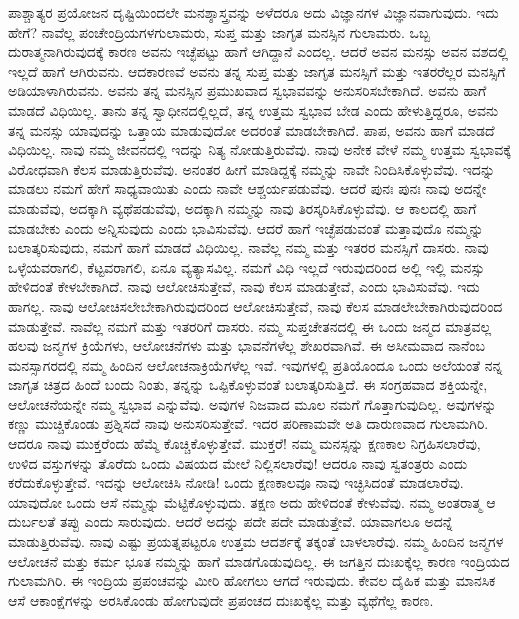 ಪಾಶ್ಚಾತ್ಯರ ಪ್ರಯೋಜನ ದೃಷ್ಟಿಯಿಂದಲೇ ಮನಶ್ಶಾಸ್ತ್ರವನ್ನು ಅಳೆದರೂ ಅದು ವಿಜ್ಞಾನಗಳ ವಿಜ್ಞಾನವಾಗುವುದು. ಇದು ಹೇಗೆ? ನಾವೆಲ್ಲ ಪಂಚೇಂದ್ರಿಯಗಳ\break ಗುಲಾಮರು, ಸುಪ್ತ ಮತ್ತು ಜಾಗೃತ ಮನಸ್ಸಿನ ಗುಲಾಮರು. ಒಬ್ಬ ದುರಾತ್ಮನಾಗಿರುವುದಕ್ಕೆ ಕಾರಣ ಅವನು ಇಚ್ಛೆಪಟ್ಟು ಹಾಗೆ ಆಗಿದ್ದಾನೆ ಎಂದಲ್ಲ. ಆದರೆ ಅವನ ಮನಸ್ಸು ಅವನ ವಶದಲ್ಲಿ ಇಲ್ಲದೆ ಹಾಗೆ ಆಗಿರುವನು. ಆದಕಾರಣವೆ ಅವನು ತನ್ನ ಸುಪ್ತ ಮತ್ತು ಜಾಗೃತ ಮನಸ್ಸಿಗೆ ಮತ್ತು ಇತರರೆಲ್ಲರ ಮನಸ್ಸಿಗೆ ಅಡಿಯಾಳಾಗಿರುವನು. ಅವನು ತನ್ನ ಮನಸ್ಸಿನ ಪ್ರಮುಖವಾದ ಸ್ವಭಾವವನ್ನು ಅನುಸರಿಸಬೇಕಾಗಿದೆ. ಅವನು ಹಾಗೆ ಮಾಡದೆ ವಿಧಿಯಿಲ್ಲ. ತಾನು ತನ್ನ ಸ್ವಾಧೀನದಲ್ಲಿಲ್ಲದೆ, ತನ್ನ ಉತ್ತಮ ಸ್ವಭಾವ ಬೇಡ ಎಂದು ಹೇಳುತ್ತಿದ್ದರೂ, ಅವನು ತನ್ನ ಮನಸ್ಸು ಯಾವುದನ್ನು ಒತ್ತಾಯ ಮಾಡುವುದೋ ಅದರಂತೆ ಮಾಡಬೇಕಾಗಿದೆ. ಪಾಪ, ಅವನು ಹಾಗೆ ಮಾಡದೆ ವಿಧಿಯಿಲ್ಲ. ನಾವು ನಮ್ಮ ಜೀವನದಲ್ಲಿ ಇದನ್ನು ನಿತ್ಯ ನೋಡುತ್ತಿರುವೆವು. ನಾವು ಅನೇಕ ವೇಳೆ ನಮ್ಮ ಉತ್ತಮ ಸ್ವಭಾವಕ್ಕೆ ವಿರೋಧವಾಗಿ ಕೆಲಸ ಮಾಡುತ್ತಿರುವೆವು. ಅನಂತರ ಹೀಗೆ ಮಾಡಿದ್ದಕ್ಕೆ ನಮ್ಮನ್ನು ನಾವೇ ನಿಂದಿಸಿಕೊಳ್ಳುವೆವು. ಇದನ್ನು ಮಾಡಲು ನಮಗೆ ಹೇಗೆ ಸಾಧ್ಯವಾಯಿತು ಎಂದು ನಾವೇ ಆಶ್ಚರ್ಯಪಡುವೆವು. ಆದರೆ ಪುನಃ ಪುನಃ ನಾವು ಅದನ್ನೇ ಮಾಡುವೆವು, ಅದಕ್ಕಾಗಿ ವ್ಯಥೆಪಡುವೆವು, ಅದಕ್ಕಾಗಿ ನಮ್ಮನ್ನು ನಾವು ತಿರಸ್ಕರಿಸಿಕೊಳ್ಳುವೆವು. ಆ ಕಾಲದಲ್ಲಿ ಹಾಗೆ ಮಾಡಬೇಕು ಎಂದು ಅನ್ನಿಸುವುದು ಎಂದು ಭಾವಿಸುವೆವು. ಆದರೆ ಹಾಗೆ ಇಚ್ಛೆಪಡುವಂತೆ ಮತ್ತಾವುದೊ ನಮ್ಮನ್ನು ಬಲಾತ್ಕರಿಸುವುದು, ನಮಗೆ ಹಾಗೆ ಮಾಡದೆ ವಿಧಿಯಿಲ್ಲ. ನಾವೆಲ್ಲ ನಮ್ಮ ಮತ್ತು ಇತರರ ಮನಸ್ಸಿಗೆ ದಾಸರು. ನಾವು ಒಳ್ಳೆಯವರಾಗಲಿ, ಕೆಟ್ಟವರಾಗಲಿ, ಏನೂ ವ್ಯತ್ಯಾಸವಿಲ್ಲ. ನಮಗೆ ವಿಧಿ ಇಲ್ಲದೆ ಇರುವುದರಿಂದ ಅಲ್ಲಿ ಇಲ್ಲಿ ಮನಸ್ಸು ಹೇಳಿದಂತೆ ಕೇಳಬೇಕಾಗಿದೆ. ನಾವು ಆಲೋಚಿಸುತ್ತೇವೆ, ನಾವು ಕೆಲಸ ಮಾಡುತ್ತೇವೆ, ಎಂದು ಭಾವಿಸುವೆವು. ಇದು ಹಾಗಲ್ಲ. ನಾವು ಆಲೋಚಿಸಲೇಬೇಕಾಗಿರುವುದರಿಂದ ಆಲೋಚಿಸುತ್ತೇವೆ, ನಾವು ಕೆಲಸ ಮಾಡಲೇಬೇಕಾಗಿರುವುದರಿಂದ ಮಾಡುತ್ತೇವೆ. ನಾವೆಲ್ಲ ನಮಗೆ ಮತ್ತು ಇತರರಿಗೆ ದಾಸರು. ನಮ್ಮ ಸುಪ್ತಚೇತನದಲ್ಲಿ ಈ ಒಂದು ಜನ್ಮದ ಮಾತ್ರವಲ್ಲ ಹಲವು ಜನ್ಮಗಳ ಕ್ರಿಯೆಗಳು, ಆಲೋಚನೆಗಳು ಮತ್ತು ಭಾವನೆಗಳೆಲ್ಲ ಶೇಖರವಾಗಿವೆ. ಈ ಅಸೀಮವಾದ ನಾನೆಂಬ ಮನಸ್ಸಾಗರದಲ್ಲಿ ನಮ್ಮ ಹಿಂದಿನ ಆಲೋಚನಾಕ್ರಿಯೆಗಳೆಲ್ಲ ಇವೆ. ಇವುಗಳಲ್ಲಿ ಪ್ರತಿಯೊಂದೂ ಒಂದು ಅಲೆಯಂತೆ ನನ್ನ ಜಾಗೃತ ಚಿತ್ರದ ಹಿಂದೆ ಬಂದು ನಿಂತು, ತನ್ನನ್ನು ಒಪ್ಪಿಕೊಳ್ಳುವಂತೆ ಬಲಾತ್ಕರಿಸುತ್ತಿದೆ. ಈ ಸಂಗ್ರಹವಾದ ಶಕ್ತಿಯನ್ನೇ, ಆಲೋಚನೆಯನ್ನೇ ನಮ್ಮ ಸ್ವಭಾವ ಎನ್ನುವೆವು. ಅವುಗಳ ನಿಜವಾದ ಮೂಲ ನಮಗೆ ಗೊತ್ತಾಗುವುದಿಲ್ಲ. ಅವುಗಳನ್ನು ಕಣ್ಣು ಮುಚ್ಚಿಕೊಂಡು ಪ್ರಶ್ನಿಸದೆ ನಾವು ಅನುಸರಿಸುತ್ತೇವೆ. ಇದರ ಪರಿಣಾಮವೇ ಅತಿ ದಾರುಣವಾದ ಗುಲಾಮಗಿರಿ. ಆದರೂ ನಾವು ಮುಕ್ತರೆಂದು ಹೆಮ್ಮೆ ಕೊಚ್ಚಿಕೊಳ್ಳುತ್ತೇವೆ. ಮುಕ್ತರೆ! ನಮ್ಮ ಮನಸ್ಸನ್ನು ಕ್ಷಣಕಾಲ ನಿಗ್ರಹಿಸಲಾರೆವು, ಉಳಿದ ವಸ್ತುಗಳನ್ನು ತೊರೆದು ಒಂದು ವಿಷಯದ ಮೇಲೆ ನಿಲ್ಲಿಸಲಾರೆವು! ಆದರೂ ನಾವು ಸ್ವತಂತ್ರರು ಎಂದು ಕರೆದುಕೊಳ್ಳುತ್ತೇವೆ. ಇದನ್ನು ಆಲೋಚಿಸಿ ನೋಡಿ! ಒಂದು ಕ್ಷಣಕಾಲವೂ ನಾವು ಇಚ್ಛಿಸಿದಂತೆ ಮಾಡಲಾರೆವು. ಯಾವುದೋ ಒಂದು ಆಸೆ ನಮ್ಮನ್ನು ಮೆಟ್ಟಿಕೊಳ್ಳುವುದು. ತಕ್ಷಣ ಅದು ಹೇಳಿದಂತೆ ಕೇಳುವೆವು. ನಮ್ಮ ಅಂತರಾತ್ಮ ಆ ದುರ್ಬಲತೆ ತಪ್ಪು ಎಂದು ಸಾರುವುದು. ಆದರೆ ಅದನ್ನು ಪದೇ ಪದೇ ಮಾಡುತ್ತೇವೆ. ಯಾವಾಗಲೂ ಅದನ್ನೆ ಮಾಡುತ್ತಿರುವೆವು. ನಾವು ಎಷ್ಟು ಪ್ರಯತ್ನಪಟ್ಟರೂ ಉತ್ತಮ ಆದರ್ಶಕ್ಕೆ ತಕ್ಕಂತೆ ಬಾಳಲಾರೆವು. ನಮ್ಮ ಹಿಂದಿನ ಜನ್ಮಗಳ ಆಲೋಚನೆ ಮತ್ತು ಕರ್ಮ ಭೂತ ನಮ್ಮನ್ನು ಹಾಗೆ ಮಾಡಗೊಡುವುದಿಲ್ಲ. ಈ ಜಗತ್ತಿನ ದುಃಖಕ್ಕೆಲ್ಲ ಕಾರಣ ಇಂದ್ರಿಯದ ಗುಲಾಮಗಿರಿ. ಈ ಇಂದ್ರಿಯ ಪ್ರಪಂಚವನ್ನು ಮೀರಿ ಹೋಗಲು ಆಗದೆ ಇರುವುದು. ಕೇವಲ ದೈಹಿಕ ಮತ್ತು ಮಾನಸಿಕ ಆಸೆ ಆಕಾಂಕ್ಷೆಗಳನ್ನು ಅರಸಿಕೊಂಡು ಹೋಗುವುದೇ ಪ್ರಪಂಚದ ದುಃಖಕ್ಕೆಲ್ಲ ಮತ್ತು ವ್ಯಥೆಗೆಲ್ಲ ಕಾರಣ.

